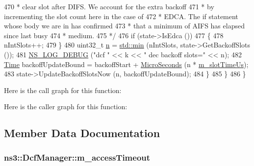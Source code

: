 \begin{DoxyCode}
470 \textcolor{comment}{           * clear slot after DIFS. We account for the extra backoff}
471 \textcolor{comment}{           * by incrementing the slot count here in the case of}
472 \textcolor{comment}{           * EDCA. The if statement whose body we are in has confirmed}
473 \textcolor{comment}{           * that a minimum of AIFS has elapsed since last busy}
474 \textcolor{comment}{           * medium.}
475 \textcolor{comment}{           */}
476           \textcolor{keywordflow}{if} (state->IsEdca ())
477             \{
478               nIntSlots++;
479             \}
480           uint32\_t \hyperlink{namespacesample-rng-plot_aeb5ee5c431e338ef39b7ac5431242e1d}{n} = \hyperlink{80211b_8c_ac6afabdc09a49a433ee19d8a9486056d}{std::min} (nIntSlots, state->GetBackoffSlots ());
481           \hyperlink{group__logging_ga413f1886406d49f59a6a0a89b77b4d0a}{NS\_LOG\_DEBUG} (\textcolor{stringliteral}{"dcf "} << k << \textcolor{stringliteral}{" dec backoff slots="} << n);
482           \hyperlink{namespacens3_1_1TracedValueCallback_a7ffd3e7c142ffe7c8a1d2db9b8de38ec}{Time} backoffUpdateBound = backoffStart + \hyperlink{group__timecivil_ga17465a639c8d1464e76538afdd78a9f0}{MicroSeconds} (n * 
      \hyperlink{classns3_1_1DcfManager_adab37a3d40ff8e7afe578f5d1fde7ba3}{m\_slotTimeUs});
483           state->UpdateBackoffSlotsNow (n, backoffUpdateBound);
484         \}
485     \}
486 \}
\end{DoxyCode}


Here is the call graph for this function\+:




Here is the caller graph for this function\+:




\subsection{Member Data Documentation}
\subsubsection[{\texorpdfstring{m\+\_\+access\+Timeout}{m_accessTimeout}}]{ ns3\+::\+Dcf\+Manager\+::m\+\_\+access\+Timeout\hspace{0.3cm}{\ttfamily [private]}}\hypertarget{classns3_1_1DcfManager_aa14d379408c9430ab07539536ab8d72e}{}\label{classns3_1_1DcfManager_aa14d379408c9430ab07539536ab8d72e}


